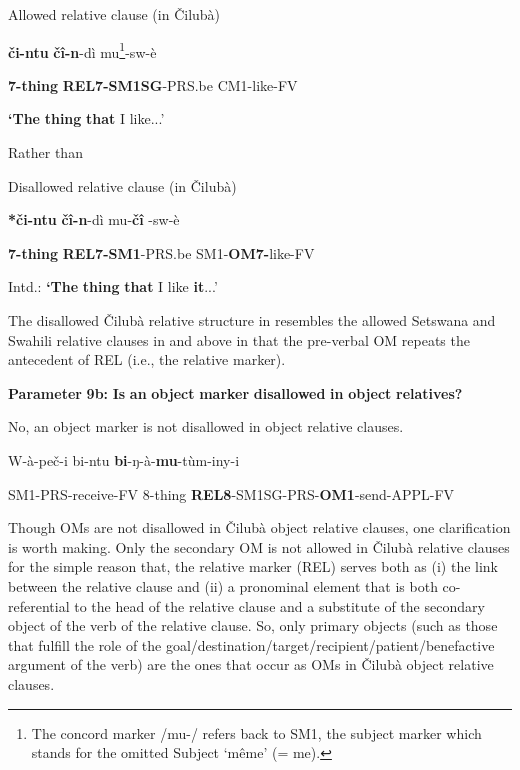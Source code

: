 \documentclass[output=paper]{langscibook}
\begin{document}
\ea%
    \label{ex:lukusa:68}
    \z

          Allowed relative clause (in Čilubà)

{\textbf{či-ntu}    \textbf{čî-n}{}-dì            mu}\footnote{The concord marker /mu-/ refers back to SM1, the subject marker which stands for the omitted Subject ‘m{\textrm{ê}}me’ (= me).}{{}-sw-è}

{\textbf{7-thing}    \textbf{REL7-SM1SG}{}-PRS.be  CM1-like-FV}

{\textbf{‘The} \textbf{thing} \textbf{that} I like...’}

Rather than

\ea%
    \label{ex:lukusa:69}
    \z

          Disallowed relative clause (in Čilubà)

{\textbf{*či-ntu}    \textbf{čî-n}{}-dì          mu-\textbf{čî}  {}-sw-è}

{        \textbf{7-thing}    \textbf{REL7-SM1}{}-PRS.be  SM1-\textbf{OM7-}like-FV}

{Intd.: \textbf{‘The} \textbf{thing} \textbf{that} I like \textbf{it}...’}

The disallowed Čilubà relative structure in  resembles the allowed Setswana and Swahili relative clauses in  and  above in that the pre-verbal OM repeats the antecedent of REL (i.e., the relative marker).

\textbf{Parameter} \textbf{9b:} \textbf{Is} \textbf{an} \textbf{object} \textbf{marker} \textbf{disallowed} \textbf{in} \textbf{object} \textbf{relatives?}

No, an object marker is not disallowed in object relative clauses.

\ea%
    \label{ex:lukusa:70}
    \z

          W-à-pe{č-i          bi-ntu  \textbf{bi}{}-ŋ-à-\textbf{mu}{}-tùm-iny-i}

SM1-PRS-receive{{}-FV    8-thing  \textbf{REL8}{}-SM1SG-PRS-\textbf{OM1}{}-send-APPL-FV}


Though OMs are not disallowed in Čilubà object relative clauses, one clarification is worth making. Only the secondary OM is not allowed in Čilubà relative clauses for the simple reason that, the relative marker (REL) serves both as (i) the link between the relative clause and (ii) a pronominal element that is both co-referential to the head of the relative clause and a substitute of the secondary object of the verb of the relative clause. So, only primary objects (such as those that fulfill the role of the goal/destination/target/recipient/patient/benefactive argument of the verb) are the ones that occur as OMs in Čilubà object relative clauses.
\end{document}
